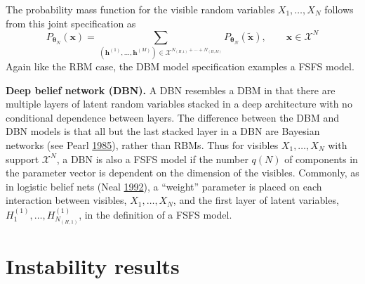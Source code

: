 \documentclass[12pt]{article}
\theoremstyle{definition}
\begin{document}
The probability mass function for the visible random variables
\(X_1, \dots, X_N\) follows from this joint specification as \[
P_{\boldsymbol \theta_N} (\boldsymbol x) = \sum\limits_{(\boldsymbol h^{(1)}, \dots, \boldsymbol h^{(M)}) \in \mathcal{X}^{N_{(H,1)} + \cdots + N_{(H,M)}}} P_{\boldsymbol \theta_N} (\tilde{\boldsymbol x}), \qquad \boldsymbol x \in \mathcal{X}^N
\] Again like the RBM case, the DBM model specification examples a FSFS
model.

\textbf{Deep belief network (DBN).} A DBN resembles a DBM in that there
are multiple layers of latent random variables stacked in a deep
architecture with no conditional dependence between layers. The
difference between the DBM and DBN models is that all but the last
stacked layer in a DBN are Bayesian networks (see Pearl
\protect\hyperlink{ref-pearl985bayesian}{1985}), rather than RBMs. Thus
for visibles \(X_1, \dots, X_N\) with support \(\mathcal{X}^N\), a DBN
is also a FSFS model if the number \(q(N)\) of components in the
parameter vector is dependent on the dimension of the visibles.
Commonly, as in logistic belief nets (Neal
\protect\hyperlink{ref-neal1992connectionist}{1992}), a ``weight''
parameter is placed on each interaction between visibles,
\(X_1, \dots, X_N\), and the first layer of latent variables,
\(H^{(1)}_1, \dots, H^{(1)}_{N_{(H,1)}}\), in the definition of a FSFS
model.

\section{Instability results}\label{instability-results}
\end{document}
